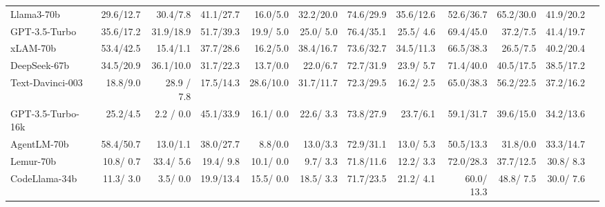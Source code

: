 \begin{table}[t!]
{\begin{tabular}{@{}lr*{10}{d{4.4}}@{}}
\colorbox{boxgreen}{Llama3-70b} & 29.6/12.7 & 30.4/\phantom{1}7.8 & 41.1/27.7 & 16.0/\phantom{1}5.0 & 32.2/20.0 & 74.6/29.9 & 35.6/12.6 & 52.6/36.7 & 65.2/30.0 & 41.9/20.2 \\

\colorbox{boxblue}{GPT-3.5-Turbo}     & 35.6/17.2  & 31.9/18.9 & 51.7/39.3 & 19.9/\phantom{1} 5.0  & 25.0/\phantom{1} 5.0  & 76.4/35.1 & 25.5/\phantom{1} 4.6 & 69.4/45.0  & 37.2/\phantom{1}7.5  &  41.4/19.7 \\

\colorbox{boxred}{xLAM-70b} & 53.4/42.5 & 15.4/\phantom{1}1.1 & 37.7/28.6 & 16.2/\phantom{1}5.0 & 38.4/16.7 & 73.6/32.7 & 34.5/11.3  & 66.5/38.3 & 26.5/7.5 & 40.2/20.4 \\


\colorbox{boxgreen}{DeepSeek-67b} & 34.5/20.9 &  36.1/10.0 &  31.7/22.3&  13.7/\phantom{1}0.0 & 22.0/\phantom{1}6.7  & 72.7/31.9 & 23.9/\phantom{1} 5.7 &  71.4/40.0 & 40.5/17.5 &  
38.5/17.2 \\



\colorbox{boxblue}{Text-Davinci-003} & 18.8/\phantom{1}9.0 & 28.9 / \phantom{1} 7.8 & 17.5/14.3 & 28.6/10.0 & 31.7/11.7 & 72.3/29.5 & 16.2/ \phantom{1} 2.5 & 65.0/38.3 & 56.2/22.5  & 37.2/16.2 \\





\colorbox{boxblue}{GPT-3.5-Turbo-16k} & 25.2/\phantom{1}4.5   & 2.2 / \phantom{1} 0.0 & 45.1/33.9 &  16.1/\phantom{1} 0.0 &  22.6/\phantom{1} 3.3  &  73.8/27.9 & 23.7/\phantom{1}6.1 & 59.1/31.7 & 39.6/15.0  & 34.2/13.6  \\

\colorbox{boxred}{AgentLM-70b} & 58.4/50.7 &  13.0/\phantom{1}1.1 &  38.0/27.7&  8.8/\phantom{1}0.0 & 13.0/\phantom{1}3.3  & 72.9/31.1 & 13.0/\phantom{1} 5.3 &  50.5/13.3 & 31.8/\phantom{1}0.0 &  33.3/14.7 \\


\colorbox{boxred}{Lemur-70b} & 10.8/\phantom{1} 0.7 &  33.4/\phantom{1} 5.6 &  19.4/\phantom{1} 9.8&  10.1/\phantom{1} 0.0 & 9.7/\phantom{1} 3.3  & 71.8/11.6 & 12.2/\phantom{1} 3.3 &  72.0/28.3 & 37.7/12.5 &  30.8/ \phantom{1} 8.3 \\ 


\colorbox{boxgreen}{CodeLlama-34b} & 11.3/\phantom{1} 3.0 & 3.5/\phantom{1} 0.0 & 19.9/13.4  & 15.5/\phantom{1} 0.0 &   18.5/\phantom{1} 3.3  & 71.7/23.5 & 21.2/ \phantom{1} 4.1 & 60.0/ 13.3 & 48.8/\phantom{1} 7.5 & 30.0/ \phantom{1} 7.6 \\


\end{tabular}}
\end{table}
